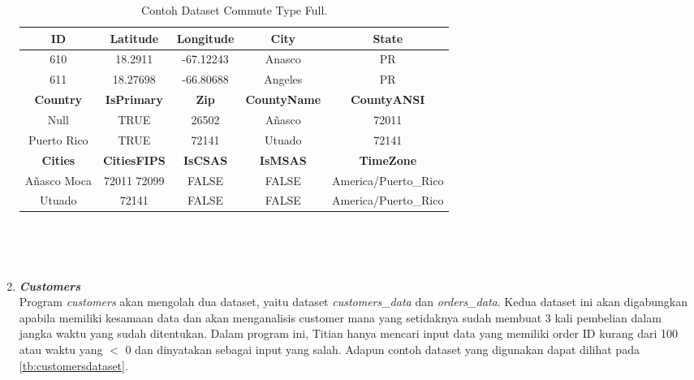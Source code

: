 \begin{enumerate}
            
            \begin{longtable}{|c|c|c|c|c|}
                  \caption{Contoh Dataset Commute Type Full.}
                  \label{tb:commutetypefulldataset} \\
                  \hline
                  \rowcolor[HTML]{C0C0C0}
                  \textbf{ID} & \textbf{Latitude} & \textbf{Longitude} & \textbf{City} & \textbf{State}\\
                  \hline
                  610 & 18.2911 & -67.12243 & Anasco & PR \\
                  611 & 18.27698 & -66.80688 & Angeles & PR \\
                  \hline
                  \rowcolor[HTML]{C0C0C0}
                  \textbf{Country} & \textbf{IsPrimary} & \textbf{Zip} & \textbf{CountyName} & \textbf{CountyANSI}\\
                  \hline
                  Null & TRUE & 26502 & Añasco & 72011 \\
                  Puerto Rico & TRUE & 72141 & Utuado & 72141 \\

                  \hline
                  \rowcolor[HTML]{C0C0C0}
                  \textbf{Cities} & \textbf{CitiesFIPS} & \textbf{IsCSAS} & \textbf{IsMSAS} & \textbf{TimeZone}\\
                  \hline
                  Añasco \textbar{} Moca  & 72011 \textbar{} 72099  & FALSE & FALSE & America/Puerto\_Rico \\
                  Utuado & 72141 & FALSE & FALSE & America/Puerto\_Rico \\
                  \hline
            \end{longtable}

      \

      \
      \item \emph{\textbf{Customers}} \\
            Program \emph{customers} akan mengolah dua dataset, yaitu dataset \emph{customers\_data} dan \emph{orders\_data}. Kedua dataset ini akan digabungkan apabila memiliki kesamaan data dan akan menganalisis customer mana yang setidaknya sudah membuat 3 kali pembelian dalam jangka waktu yang sudah ditentukan. Dalam program ini, Titian hanya mencari input data yang memiliki order ID kurang dari 100 atau waktu yang $ < $ 0 dan dinyatakan sebagai input yang salah.
            Adapun contoh dataset yang digunakan dapat 
            dilihat pada \ref{tb:customersdataset}.


\end{enumerate}
